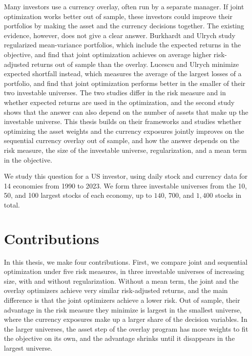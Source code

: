 Many investors use a currency overlay, often run by a separate manager. If joint optimization works better out of
sample, these investors could improve their portfolios by making the asset and the currency decisions together. The
existing evidence, however, does not give a clear answer. Burkhardt and Ulrych
\cite{SparseAndStableInternationalPortfolioOptimization} study regularized mean-variance portfolios, which include the
expected returns in the objective, and find that joint optimization achieves on average higher risk-adjusted returns
out of sample than the overlay. Lucescu and Ulrych \cite{RegularizedMultiCurrencyExpectedShortfallPortfolios} minimize
expected shortfall instead, which measures the average of the largest losses of a portfolio, and find that joint
optimization performs better in the smaller of their two investable universes. The two studies differ in the risk
measure and in whether expected returns are used in the optimization, and the second study shows that the answer can also depend
on the number of assets that make up the investable universe. This thesis builds on their frameworks and studies whether optimizing the asset weights and
the currency exposures jointly improves on the sequential currency overlay out of sample, and how the answer depends on
the risk measure, the size of the investable universe, regularization, and a mean term in the objective.

We study this question for a US investor, using daily stock and currency data for 14 economies from 1990 to 2023.
We form three investable universes from the 10, 50, and 100 largest stocks of each economy, up to $140$, $700$, and
$1{,}400$ stocks in total.


\section{Contributions}

In this thesis, we make four contributions. First, we compare joint and sequential optimization under five risk
measures, in three investable universes of increasing size, with and without regularization. Without a mean term,
the joint and the overlay optimizers achieve very similar risk-adjusted returns, and the main difference is that the
joint optimizers achieve a lower risk. Out of sample, their advantage in the risk measure they minimize 
is largest in the smallest universe, where the currency exposures make up a larger share of the decision 
variables. In the larger universes, the asset step of the overlay program has more weights to fit 
the objective on its own, and the advantage shrinks until it disappears in the largest universe.


